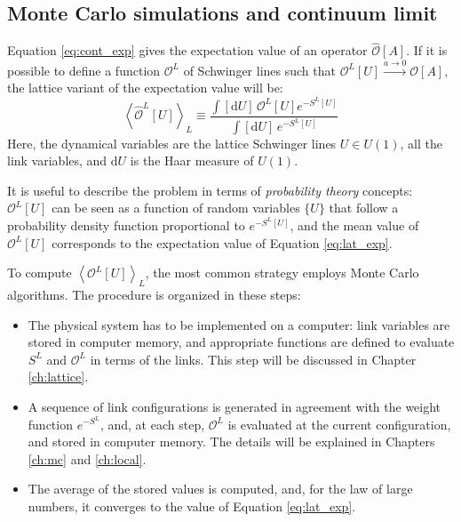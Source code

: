 \subsection*{Monte Carlo simulations and continuum limit}

Equation \eqref{eq:cont_exp} gives the expectation value of an operator $\hat{\mathcal O}[A]$.
If it is possible to define a function $\mathcal O^L$ of Schwinger lines such that $\mathcal O^L[U] \xrightarrow{a\to0} \mathcal O[A]$,
the lattice variant of the expectation value will be:
\begin{equation}\label{eq:lat_exp}
    \left<\hat{\mathcal O}^L[U]\right>_L \equiv \frac{\int[\mathrm dU]\, \mathcal O^L[U] e^{-S^L[U]}}{\int[\mathrm dU]\,e^{-S^L[U]}}
\end{equation}
Here, the dynamical variables are the lattice Schwinger lines $U \in U(1)$, \ie all the link variables, and $\mathrm dU$ is the Haar measure of $U(1)$.

It is useful to describe the problem in terms of \emph{probability theory} concepts:
$\mathcal O^L[U]$ can be seen as a function of random variables $\{U\}$ that follow a probability density function proportional to $e^{-S^L[U]}$,
and the mean value of $\mathcal O^L[U]$ corresponds to the expectation value of Equation \eqref{eq:lat_exp}.

To compute $\left<\mathcal O^L[U]\right>_L$, the most common strategy employs Monte Carlo algorithms.
The procedure is organized in these steps:
\begin{itemize}
    \item The physical system has to be implemented on a computer: link variables are stored in computer memory,
        and appropriate functions are defined to evaluate $S^L$ and $\mathcal O^L$ in terms of the links.
        This step will be discussed in Chapter \ref{ch:lattice}.
    \item A sequence of link configurations is generated in agreement with the weight function $e^{-S^L}$, and, at each step,
        $\mathcal O^L$ is evaluated at the current configuration, and stored in computer memory. The details will be explained in Chapters \ref{ch:mc} and \ref{ch:local}.
    \item The average of the stored values is computed, and, for the law of large numbers,
        it converges to the value of Equation \ref{eq:lat_exp}.
\end{itemize}

